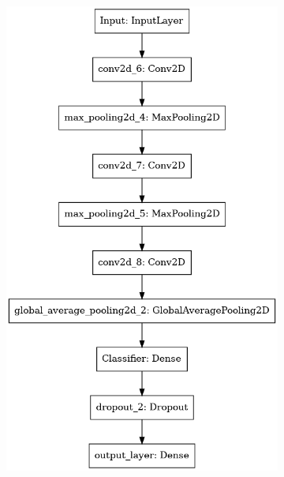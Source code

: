 \documentclass[a4paper,12pt]{article}
\numberwithin{equation}{section}
\begin{document}
\begin{figure}
\begin{subfigure}{0.4\textwidth}
            \includegraphics[scale=0.15]{model_noaug.png}
      \end{subfigure}
\end{figure}
\end{document}
